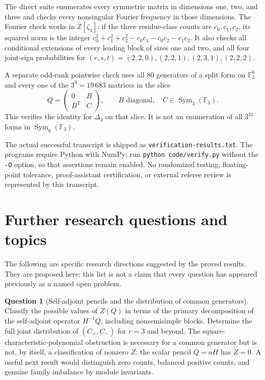 \documentclass[11pt,a4paper]{article}
\theoremstyle{definition}
\newtheorem{question}[theorem]{Question}
\theoremstyle{remark}
\newcommand{\F}{\mathbb F}
\newcommand{\Sym}{\operatorname{Sym}}
\newcommand{\J}{\mathsf J}
\begin{document}
The direct suite enumerates every symmetric matrix in dimensions one, two,
and three and checks every nonsingular Fourier frequency in those dimensions.
The Fourier check works in $\mathbb Z[\zeta_3]$: if the three residue-class
counts are $c_0,c_1,c_2$, its squared norm is the integer
$c_0^2+c_1^2+c_2^2-c_0c_1-c_0c_2-c_1c_2$.
It also checks all conditional extensions of every leading block of sizes
one and two, and all four joint-sign probabilities for
$(r,s,t)=(2,2,0),(2,2,1),(2,3,1),(2,2,2)$.

A separate odd-rank pointwise check uses all 80 generators of a split form
on $\F_3^6$ and every one of the $3^9=19\,683$ matrices in the slice
\[
 Q=\begin{pmatrix}0&B\\B^{\mathsf T}&C\end{pmatrix},
 \qquad B\text{ diagonal},\quad C\in\Sym_3(\F_3).
\]
This verifies the identity for $\Delta_\J$ on that slice. It is not an
enumeration of all $3^{21}$ forms in $\Sym_6(\F_3)$.

The actual successful transcript is shipped as
\texttt{verification-results.txt}. The programs require Python with NumPy;
run \texttt{python code/verify.py} without the \texttt{-O} option, so that
assertions remain enabled. No randomized testing, floating-point tolerance,
proof-assistant certification, or external referee review is represented by
this transcript.

\section{Further research questions and topics}
\label{sec:questions}
The following are specific research directions suggested by the proved
results. They are proposed here; this list is not a claim that every question
has appeared previously as a named open problem.

\begin{question}[Self-adjoint pencils and the distribution of common generators]
Classify the possible values of $Z(Q)$ in terms of the primary decomposition
of the self-adjoint operator $H^{-1}Q$, including nonsemisimple blocks.
Determine the full joint distribution of $(C_+,C_-)$ for $r=3$ and beyond.
The square-characteristic-polynomial obstruction is necessary for a common
generator but is not, by itself, a classification of nonzero $Z$: the scalar
pencil $Q=aH$ has $Z=0$. A useful next result would distinguish zero counts,
balanced positive counts, and genuine family imbalance by module invariants.
\end{question}
\end{document}
